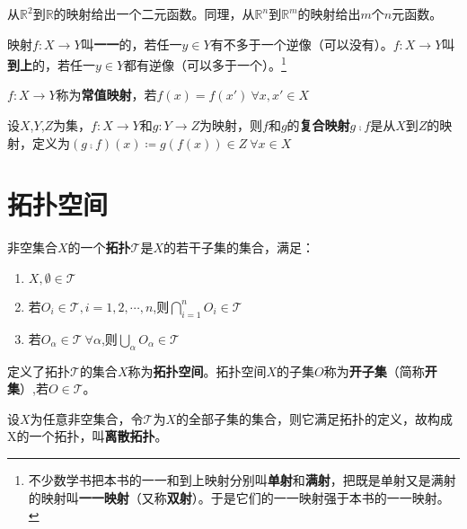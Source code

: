 \begin{note}
	从$\mathbb{R}^2$到$\mathbb{R}$的映射给出一个二元函数。同理，从$\mathbb{R}^n$到$\mathbb{R}^m$的映射给出$m$个$n$元函数。
\end{note}

\begin{definition}
	映射$f \colon X \to Y$叫\textbf{一一}的，若任一$y \in Y$有不多于一个逆像（可以没有）。$f \colon X \to Y$叫\textbf{到上}的，若任一$y \in Y$都有逆像（可以多于一个）。\footnote{
		不少数学书把本书的一一和到上映射分别叫\textbf{单射}和\textbf{满射}，把既是单射又是满射的映射叫\textbf{一一映射}（又称\textbf{双射}）。于是它们的一一映射强于本书的一一映射。
	}
\end{definition}

\begin{definition}
	$f \colon X \to Y$称为\textbf{常值映射}，若$f(x) = f(x') ~ \forall x, x' \in X$
\end{definition}

\begin{definition}
	设$X$,$Y$,$Z$为集，$f \colon X \to Y$和$g \colon Y \to Z$为映射，则$f$和$g$的\textbf{复合映射}$g \comp f$是从$X$到$Z$的映射，定义为$(g \comp f)(x) \coloneq g(f(x)) \in Z ~ \forall x \in X$
\end{definition}

\section{拓扑空间}

\begin{definition}
	非空集合$X$的一个\textbf{拓扑}$\mathscr{T}$是$X$的若干子集的集合，满足：
	\begin{enumerate}[（a）]
		\item $X,\emptyset \in \mathscr{T}$
		\item 若$O_i \in \mathscr{T}, i = 1, 2, \cdots, n$,则$\bigcap\limits^n_{i = 1}O_i \in \mathscr{T}$
		\item 若$O_\alpha \in \mathscr{T} ~ \forall \alpha$,则$\bigcup\limits_{\alpha}O_\alpha \in \mathscr{T}$
	\end{enumerate}
\end{definition}

\begin{definition}
	定义了拓扑$\mathscr{T}$的集合$X$称为\textbf{拓扑空间}。拓扑空间$X$的子集$O$称为\textbf{开子集}（简称\textbf{开集}）,若$O \in \mathscr{T}$。
\end{definition}

\begin{example}
	设$X$为任意非空集合，令$\mathscr{T}$为$X$的全部子集的集合，则它满足拓扑的定义，故构成X的一个拓扑，叫\textbf{离散拓扑}。
\end{example}

